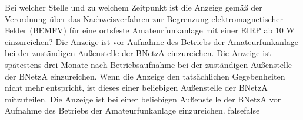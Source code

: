     {Bei welcher Stelle und zu welchem Zeitpunkt ist die Anzeige gemäß der Verordnung über das Nachweisverfahren zur Begrenzung elektromagnetischer Felder (BEMFV) für eine ortsfeste Amateurfunkanlage mit einer EIRP ab 10 W einzureichen?}
    {Die Anzeige ist vor Aufnahme des Betriebs der Amateurfunkanlage bei der zuständigen Außenstelle der BNetzA einzureichen.}
    {Die Anzeige ist spätestens drei Monate nach Betriebsaufnahme bei der zuständigen Außenstelle der BNetzA einzureichen.}
    {Wenn die Anzeige den tatsächlichen Gegebenheiten nicht mehr entspricht, ist dieses einer beliebigen Außenstelle der BNetzA mitzuteilen.}
    {Die Anzeige ist bei einer beliebigen Außenstelle der BNetzA vor Aufnahme des Betriebs der Amateurfunkanlage einzureichen.}
    {false}{false}